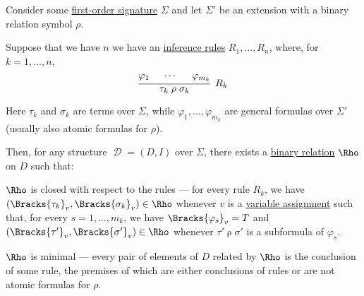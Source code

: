 \begin{theorem}\label{thm:recursively_defined_relations}
  Consider some \hyperref[def:first_order_signature]{first-order signature} \( \Sigma \) and let \( \Sigma' \) be an extension with a binary relation symbol \( \rho \).

  Suppose that we have \( n \) we have an \hyperref[def:inference_rule]{inference rules} \( R_1, \ldots, R_n \), where, for \( k = 1, \ldots, n \),
  \begin{equation*}
    \begin{prooftree}
      \hypo{ \varphi_1 }
      \hypo{ \cdots }
      \hypo{ \varphi_{m_k} }
      \infer3[\( R_k \)]{ \tau_k \mathrel{\rho} \sigma_k }.
    \end{prooftree}
  \end{equation*}

  Here \( \tau_k \) and \( \sigma_k \) are terms over \( \Sigma \), while \( \varphi_1, \ldots, \varphi_{m_k} \) are general formulas over \( \Sigma' \) (usually also atomic formulas for \( \rho \)).

  Then, for any structure \( \mscrD = (D, I) \) over \( \Sigma \), there exists a \hyperref[def:binary_relation]{binary relation} \( \Rho \) on \( D \) such that:
  \begin{thmenum}
     \( \Rho \) is closed with respect to the rules --- for every rule \( R_k \), we have \( (\Bracks{\tau_k}_v, \Bracks{\sigma_k}_v) \in \Rho \) whenever \( v \) is a \hyperref[def:first_order_valuation/variable_assignment]{variable assignment} such that, for every \( s = 1, \ldots, m_k \), we have \( \Bracks{\varphi_s}_v = T \) and \( (\Bracks{\tau'}_v, \Bracks{\sigma'}_v) \in \Rho \) whenever \( \tau' \mathrel{\rho} \sigma' \) is a subformula of \( \varphi_s \).

     \( \Rho \) is minimal --- every pair of elements of \( D \) related by \( \Rho \) is the conclusion of some rule, the premises of which are either conclusions of rules or are not atomic formulas for \( \rho \).
  \end{thmenum}
\end{theorem}
